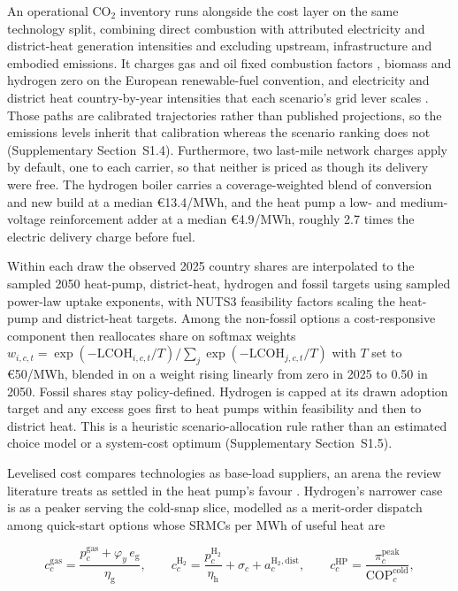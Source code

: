 An operational CO$_2$ inventory runs alongside the cost layer on the same technology split, combining direct combustion with attributed electricity and district-heat generation intensities and excluding upstream, infrastructure and embodied emissions. It charges
gas and oil fixed combustion factors \citep{Calvin2023Ipcc}, biomass and hydrogen zero
on the European renewable-fuel convention, and electricity and district heat
country-by-year intensities that each scenario's grid lever scales
\citep{EMBER2024electricity,EEA2024gridintensity}. Those paths are calibrated
trajectories rather than published projections, so the emissions levels inherit that
calibration whereas the scenario ranking does not (Supplementary Section~S1.4).
Furthermore, two last-mile network charges apply by default, one to each carrier, so that
neither is priced as though its delivery were free. The hydrogen boiler carries a coverage-weighted blend of conversion and new build at a median \euro{}13.4/MWh, and the heat pump a low- and medium-voltage reinforcement adder at a median \euro{}4.9/MWh, roughly 2.7 times the electric delivery charge before fuel.

Within each draw the observed 2025 country shares are interpolated to the sampled 2050 heat-pump, district-heat, hydrogen and fossil targets using sampled power-law uptake exponents, with NUTS3 feasibility factors scaling the heat-pump and district-heat targets. Among the non-fossil options a cost-responsive component then reallocates share on softmax weights $w_{i,c,t}=\exp(-\mathrm{LCOH}_{i,c,t}/T)/\sum_j \exp(-\mathrm{LCOH}_{j,c,t}/T)$ with $T$ set to \euro{}50/MWh, blended in on a weight rising linearly from zero in 2025 to 0.50 in 2050. Fossil shares stay policy-defined. Hydrogen is capped at its drawn adoption target and any excess goes first to heat pumps within feasibility and then to district heat. This is a heuristic scenario-allocation rule rather than an estimated choice model or a system-cost optimum (Supplementary Section~S1.5).

Levelised cost compares technologies as base-load suppliers, an arena the review literature
treats as settled in the heat pump's favour
\citep{Rosenow2022PipeDream,Rosenow2024MetaReview,Billerbeck2023Race}. Hydrogen's narrower
case is as a peaker serving the cold-snap slice, modelled as a merit-order dispatch among
quick-start options whose SRMCs per MWh of useful heat are

\begin{equation}
\label{eq:srmc}
 c^{\mathrm{gas}}_{c}
 = \frac{p^{\mathrm{gas}}_{c} + \varphi_{y}\, e_{\mathrm{g}}}{\eta_{\mathrm{g}}},
 \qquad
  c^{\mathrm{H_2}}_{c}
 = \frac{p^{\mathrm{H_2}}_{c}}{\eta_{\mathrm{h}}} + \sigma_{c}
 + a^{\mathrm{H_2,dist}}_{c},
 \qquad
 c^{\mathrm{HP}}_{c}
 = \frac{\pi^{\mathrm{peak}}_{c}}{\mathrm{COP}^{\mathrm{cold}}_{c}},
\end{equation}

